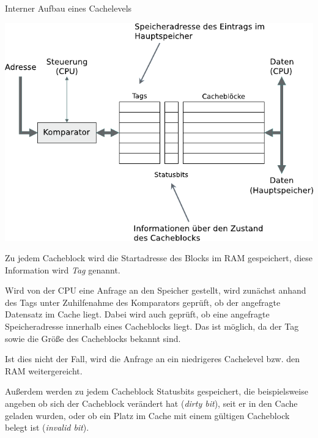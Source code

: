 \documentclass[german]{spicker}
\begin{document}
\begin{bonus}{Interner Aufbau eines Cachelevels}
    \begin{center}
        \includegraphics[]{images/cache_level.pdf}
    \end{center}

    Zu jedem Cacheblock wird die Startadresse des Blocks im RAM gespeichert, diese
    Information wird \emph{Tag} genannt.

    Wird von der CPU eine Anfrage an den Speicher
    gestellt, wird zunächst anhand des Tags unter Zuhilfenahme des Komparators geprüft, ob der angefragte Datensatz im Cache liegt. Dabei wird auch geprüft, ob eine
    angefragte Speicheradresse innerhalb eines Cacheblocks liegt. Das ist möglich, da
    der Tag sowie die Größe des Cacheblocks bekannt sind.

    Ist dies nicht der Fall, wird
    die Anfrage an ein niedrigeres Cachelevel bzw. den RAM weitergereicht.

    Außerdem
    werden zu jedem Cacheblock Statusbits gespeichert, die beispielsweise angeben ob
    sich der Cacheblock verändert hat (\emph{dirty bit}), seit er in den Cache geladen wurden,
    oder ob ein Platz im Cache mit einem gültigen Cacheblock belegt ist (\emph{invalid bit}).
\end{bonus}
\end{document}
